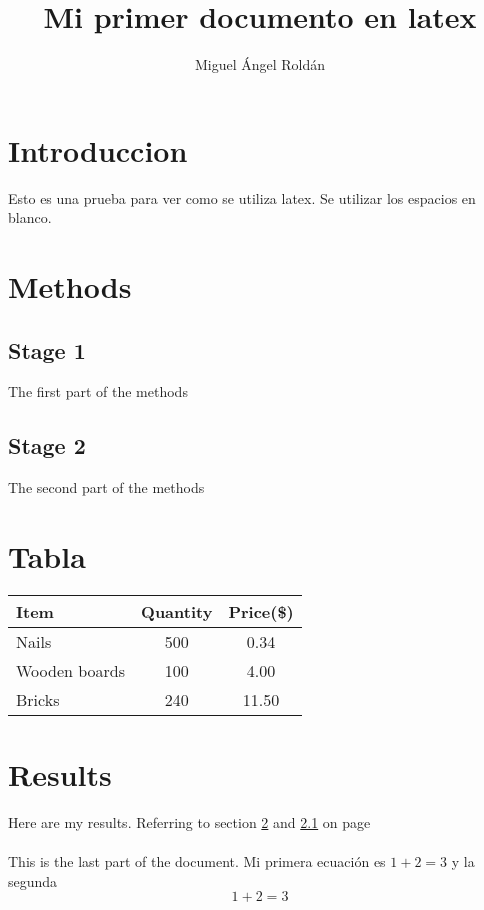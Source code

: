 \documentclass{article}
\begin{document}
\title{Mi primer documento en latex}
\author{Miguel Ángel Roldán}
\date{}
\maketitle

\tableofcontents
\newpage
{}
\section{Introduccion}
Esto es una prueba para ver como se utiliza latex.
\newline Se utilizar los espacios en blanco.

\section{Methods}%
\label{sec0}

\subsection{Stage 1}
\label{sec1}
The first part of the methods

\subsection{Stage 2}
The second part of the methods

\section{Tabla}
\begin{tabular}{l|c|c}
Item & Quantity & Price(\$)\\
\hline
Nails & 500 & 0.34 \\
Wooden boards & 100 & 4.00 \\
Bricks & 240 & 11.50
\end{tabular}

\section{Results}
Here are my results. Referring to section \ref{sec0} and \ref{sec1} on page \pageref{sec1}
\paragraph{}
This is the last part of the document. Mi primera ecuación es $1+2=3$ y la segunda $$1+2=3$$
\end{document}
